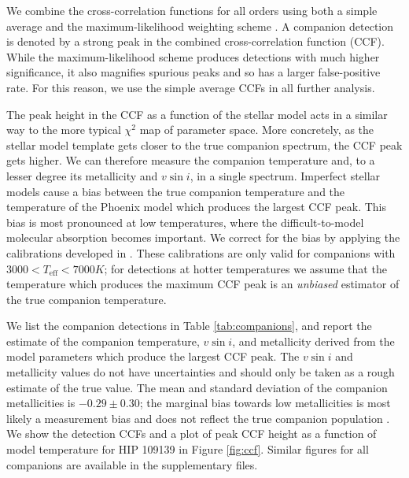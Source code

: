 \documentclass{emulateapj}
\begin{document}
We combine the cross-correlation functions for all orders using both a simple average and the maximum-likelihood weighting scheme \citep{Zucker2003}. A companion detection is denoted by a strong peak in the combined cross-correlation function (CCF). While the maximum-likelihood scheme produces detections with much higher significance, it also magnifies spurious peaks and so has a larger false-positive rate. For this reason, we use the simple average CCFs in all further analysis.

The peak height in the CCF as a function of the stellar model acts in a similar way to the more typical $\chi^2$ map of parameter space. More concretely, as the stellar model template gets closer to the true companion spectrum, the CCF peak gets higher. We can therefore measure the companion temperature and, to a lesser degree its metallicity and $v\sin{i}$, in a single spectrum. Imperfect stellar models cause a bias between the true companion temperature and the temperature of the Phoenix model which produces the largest CCF peak. This bias is most pronounced at low temperatures, where the difficult-to-model molecular absorption becomes important. We correct for the bias by applying the calibrations developed in \citet{Gullikson2016}. These calibrations are only valid for companions with $3000 < T_\mathrm{eff} < 7000 K$; for detections at hotter temperatures we assume that the temperature which produces the maximum CCF peak is an \emph{unbiased} estimator of the true companion temperature.

We list the companion detections in Table \ref{tab:companions}, and report the estimate of the companion temperature, $v\sin{i}$, and metallicity derived from the model parameters which produce the largest CCF peak. The $v\sin{i}$ and metallicity values do not have uncertainties and should only be taken as a rough estimate of the true value. The mean and standard deviation of the companion metallicities is $-0.29 \pm 0.30$; the marginal bias towards low metallicities is most likely a measurement bias and does not reflect the true companion population \citep{Gullikson2016}.  We show the detection CCFs and a plot of peak CCF height as a function of model temperature for HIP 109139 in Figure \ref{fig:ccf}. Similar figures for all companions are available in the supplementary files.
\end{document}
